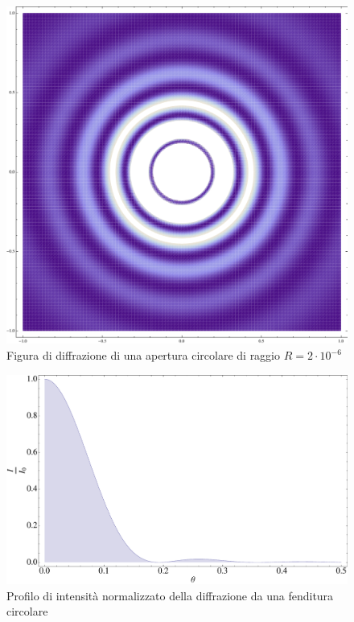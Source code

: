 \documentclass[a4paper,10pt,oneside]{article}
\begin{document}
\begin{figure}[H]
 \centering
 \includegraphics[width=\textwidth]{./Immagini/diffrazione4.pdf}
 \caption{Figura di diffrazione di una apertura circolare di raggio $R=2\cdot 10^{-6}$}
 \label{fig:diffrazione_circolare}
\end{figure}


\begin{figure}
 \centering
 \includegraphics[width=\textwidth]{./Immagini/diffrazione5.pdf}
 \caption{Profilo di intensità normalizzato della diffrazione da una fenditura circolare}
 \label{fig:bessel_2}
\end{figure}
\end{document}
